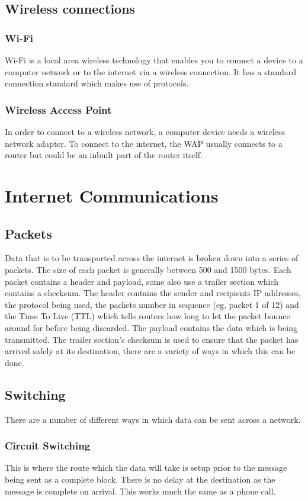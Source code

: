 \documentclass[a4paper,11pt, twocolumn]{article}
\begin{document}
\subsection{Wireless connections}
\subsubsection{Wi-Fi}
Wi-Fi is a local area wireless technology that enables you to connect a device to a computer network or to the internet via a wireless connection. It has a standard connection standard which makes use of protocols.
\subsubsection{Wireless Access Point}
In order to connect to a wireless network, a computer device needs a wireless network adapter. To connect to the internet, the WAP usually connects to a router but could be an inbuilt part of the router itself.

\section{Internet Communications}
\subsection{Packets}
Data that is to be transported across the internet is broken down into a series of packets. The size of each packet is generally between 500 and 1500 bytes. Each packet contains a header and payload, some also use a trailer section which contains a checksum. The header contains the sender and recipients IP addresses, the protocol being used, the packets number in sequence (eg, packet 1 of 12) and the Time To Live (TTL) which tells routers how long to let the packet bounce around for before being discarded. The payload contains the data which is being transmitted. The trailer section's checksum is used to ensure that the packet has arrived safely at its destination, there are a variety of ways in which this can be done.
\subsection{Switching}
There are a number of different ways in which data can be sent across a network.
\subsubsection{Circuit Switching}
This is where the route which the data will take is setup prior to the message being sent as a complete block. There is no delay at the destination as the message is complete on arrival. This works much the same as a phone call.
\end{document}
